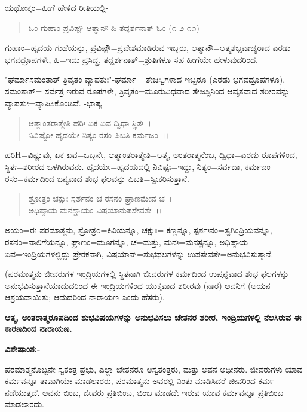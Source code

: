 ಯಥೋಕ್ತಂ=ಹೀಗೆ ಹೇಳಿದ ರೀತಿಯಲ್ಲಿ-

\begin{verse}
ಓಂ ಗುಹಾಂ ಪ್ರವಿಷ್ಟೌ ಆತ್ಮಾನೌ ಹಿ ತದ್ದರ್ಶನಾತ್ ಓಂ (೧-೨-೧೧)
\end{verse}

ಗುಹಾಂ=ಹೃದಯ ಗುಹೆಯನ್ನು, ಪ್ರವಿಷ್ಟೌ=ಪ್ರವೇಶಮಾಡಿರುವ ಇಬ್ಬರು, ಆತ್ಮಾನೌ=ಆತ್ಮಶಬ್ದವಾಚ್ಯರಾದ ಎರಡು ಭಗವದ್ರೂಪಗಳೇ, ಹಿ=ಇದು ಪ್ರಸಿದ್ಧ, ತದ್ದರ್ಶನಾತ್=ಶ್ರುತಿಗಳೂ ಸಹ ಹೀಗೆಯೇ ಹೇಳುವುದರಿಂದ.

"ಘರ್ಮಾಸಮಂತಾತ್ ತ್ರಿವೃತಂ ವ್ಯಾಪತುಃ"-ಘರ್ಮಾ= ತೇಜಸ್ವಿಗಳಾದ ಇಬ್ಬರೂ (ಎರಡು ಭಗವದ್ರೂಪಗಳೂ), ಸಮಂತಾತ್= ಸರ್ವತ್ರ ಇರುವ ರೂಪಗಳೇ, ತ್ರಿವೃತಂ=ಮೂರುವಿಧವಾದ ತೇಜಸ್ಸಿನಿಂದ ಆವೃತವಾದ ಶರೀರವನ್ನು ವ್ಯಾಪತುಃ=ವ್ಯಾಪಿಸಿಕೊಂಡಿವೆ. -ಭಾಷ್ಯ

\begin{verse}
ಆತ್ಮಾಂತರಾತ್ಮೇತಿ ಹರಿಃ ಏಕ ಏವ ದ್ವಿಧಾ ಸ್ಥಿತಃ~।\\ ನಿವಿಷ್ಟೋ ಹೃದಯೇ ನಿತ್ಯಂ ರಸಂ ಪಿಬತಿ ಕರ್ಮಜಂ~।।
\end{verse}


ಹರಿH=ವಿಷ್ಣುವು, ಏಕ ಏವ=ಒಬ್ಬನೇ, ಆತ್ಮಾಂತರಾತ್ಮೇತಿ=ಆತ್ಮ, ಅಂತರಾತ್ಮನೆಂಬ, ದ್ವಿಧಾ=ಎರಡು ರೂಪಗಳಿಂದ, ಸ್ಥಿತಃ=ಶರೀರದ ಒಳಗಿರುವನು. ಹೃದಯೇ=ಹೃದಯದಲ್ಲಿ ನಿವಿಷ್ಟಃ=ಇದ್ದು, ನಿತ್ಯಂ=ಸರ್ವದಾ, ಕರ್ಮಜಂ ರಸಂ=ಕರ್ಮದಿಂದ ಜನ್ಯವಾದ ಶುಭ ಫಲವನ್ನು ಪಿಬತಿ=ಸ್ವೀಕರಿಸುತ್ತಾನೆ.

\begin{verse}
ಶ್ರೋತ್ರಂ ಚಕ್ಷುಃ ಸ್ಪರ್ಶನಂ ಚ ರಸನಂ ಘ್ರಾಣಮೇವ ಚ~।\\ ಅಧಿಷ್ಠಾಯ ಮನಶ್ಚಾಯಂ ವಿಷಯಾನುಪಸೇವತೇ~।।
\end{verse}


ಅಯಂ=ಈ ಪರಮಾತ್ಮನು, ಶ್ರೋತ್ರ೦=ಕಿವಿಯನ್ನೂ, ಚಕ್ಷುಃ= ಕಣ್ಣನ್ನೂ, ಸ್ಪರ್ಶಃನಂ=ತ್ವಗಿಂದ್ರಿಯವನ್ನೂ, ರಸನಂ=ನಾಲಿಗೆಯನ್ನೂ, ಘ್ರಾಣಂ=ಮೂಗನ್ನೂ, ಚ=ಮತ್ತು, ಮನಃ=ಮನಸ್ಸನ್ನೂ, ಅಧಿಷ್ಠಾಯ ಏವ=ಇಂದ್ರಿಯಗಳಲ್ಲಿದ್ದು ಪ್ರೇರಕನಾಗಿ, ವಿಷಯಾನ್=ಶುಭಫಲಗಳನ್ನು ಉಪಸೇವತೇ=ಅನುಭವಿಸುತ್ತಾನೆ.

(ಪರಮಾತ್ಮನು ಜೀವರುಗಳ ಇಂದ್ರಿಯಗಳಲ್ಲಿ ಸ್ಥಿತನಾಗಿ ಜೀವರುಗಳ ಕರ್ಮದಿಂದ ಉಪ್ತನ್ನವಾದ ಶುಭ ಫಲಗಳನ್ನು ಅನುಭವಿಸುತ್ತಾನೆಯಾದುದರಿಂದ ಈ ಇಂದ್ರಿಯಗಳಿಂದ ಯುಕ್ತವಾದ ಶರೀರವು (ನಾರ) ಅವನಿಗೆ (ಅಯನ ಆಶ್ರಯವಾಯಿತು; ಆದುದರಿಂದ ನಾರಾಯಣ ಎಂದು ಹೆಸರು).

\begin{center}
\textbf{ಆತ್ಮ, ಅಂತರಾತ್ಮರೂಪದಿಂದ ಶುಭವಿಷಯಗಳನ್ನು ಅನುಭವಿಸಲು ಚೇತನರ ಶರೀರ, ಇಂದ್ರಿಯಗಳಲ್ಲಿ ನೆಲಸಿರುವ ಈ ಕಾರಣದಿಂದ ನಾರಾಯಣ.}
\end{center}

\noindent
\textbf{ವಿಶೇಷಾಂಶ:-}

ಪರಮಾತ್ಮನೊಬ್ಬನೇ ಸ್ವತಂತ್ರ ಪ್ರಭು, ಎಲ್ಲಾ ಚೇತನರೂ ಅಸ್ವತಂತ್ರರು, ಮತ್ತು ಅವನ ಅಧೀನರು. ಜೀವರುಗಳು ಯಾವ ಕರ್ಮವನ್ನೂ ತಾವಾಗಿಯೇ ಮಾಡಲಾರರು, ಪರಮಾತ್ಮನು ಅವರಲ್ಲಿ ನಿಂತು ಮಾಡಿಸಿದರೆ ಜೀವರಿಂದ ಕರ್ಮ ನಡೆಯುತ್ತದೆ. ಅವನು ಬಿಂಬ, ಜೀವರು ಪ್ರತಿಬಿಂಬ, ಬಿಂಬ ಮಾಡದೇ ಇರುವ ಯಾವ ಕರ್ಮವನ್ನೂ ಪ್ರತಿಬಿಂಬ ಮಾಡಲಾರದು.

